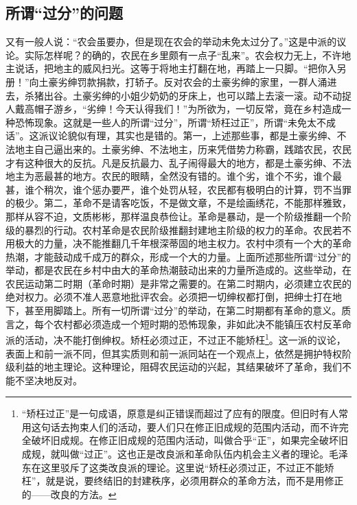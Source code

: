 \documentclass[cn,11pt,chinese]{elegantbook}
\def\myformat#1{\hfil\hfil #1}
\begin{document}
\subsection*{\myformat{所谓“过分”的问题}}
又有一般人说：“农会虽要办，但是现在农会的举动未免太过分了。”这是中派的议论。实际怎样呢？的确的，农民在乡里颇有一点子“乱来”。农会权力无上，不许地主说话，把地主的威风扫光。这等于将地主打翻在地，再踏上一只脚。“把你入另册！”向土豪劣绅罚款捐款，打轿子。反对农会的土豪劣绅的家里，一群人涌进去，杀猪出谷。土豪劣绅的小姐少奶奶的牙床上，也可以踏上去滚一滚。动不动捉人戴高帽子游乡，“劣绅！今天认得我们！”为所欲为，一切反常，竟在乡村造成一种恐怖现象。这就是一些人的所谓“过分”，所谓“矫枉过正”，所谓“未免太不成话”。这派议论貌似有理，其实也是错的。第一，上述那些事，都是土豪劣绅、不法地主自己逼出来的。土豪劣绅、不法地主，历来凭借势力称霸，践踏农民，农民才有这种很大的反抗。凡是反抗最力、乱子闹得最大的地方，都是土豪劣绅、不法地主为恶最甚的地方。农民的眼睛，全然没有错的。谁个劣，谁个不劣，谁个最甚，谁个稍次，谁个惩办要严，谁个处罚从轻，农民都有极明白的计算，罚不当罪的极少。第二，革命不是请客吃饭，不是做文章，不是绘画绣花，不能那样雅致，那样从容不迫，文质彬彬，那样温良恭俭让。革命是暴动，是一个阶级推翻一个阶级的暴烈的行动。农村革命是农民阶级推翻封建地主阶级的权力的革命。农民若不用极大的力量，决不能推翻几千年根深蒂固的地主权力。农村中须有一个大的革命热潮，才能鼓动成千成万的群众，形成一个大的力量。上面所述那些所谓“过分”的举动，都是农民在乡村中由大的革命热潮鼓动出来的力量所造成的。这些举动，在农民运动第二时期（革命时期）是非常之需要的。在第二时期内，必须建立农民的绝对权力。必须不准人恶意地批评农会。必须把一切绅权都打倒，把绅士打在地下，甚至用脚踏上。所有一切所谓“过分”的举动，在第二时期都有革命的意义。质言之，每个农村都必须造成一个短时期的恐怖现象，非如此决不能镇压农村反革命派的活动，决不能打倒绅权。矫枉必须过正，不过正不能矫枉\footnote[4]{ “矫枉过正”是一句成语，原意是纠正错误而超过了应有的限度。但旧时有人常用这句话去拘束人们的活动，要人们只在修正旧成规的范围内活动，而不许完全破坏旧成规。在修正旧成规的范围内活动，叫做合乎“正”，如果完全破坏旧成规，就叫做“过正”。这也正是改良派和革命队伍内机会主义者的理论。毛泽东在这里驳斥了这类改良派的理论。这里说“矫枉必须过正，不过正不能矫枉”，就是说，要终结旧的封建秩序，必须用群众的革命方法，而不是用修正的——改良的方法。}。这一派的议论，表面上和前一派不同，但其实质则和前一派同站在一个观点上，依然是拥护特权阶级利益的地主理论。这种理论，阻碍农民运动的兴起，其结果破坏了革命，我们不能不坚决地反对。\\
\end{document}

